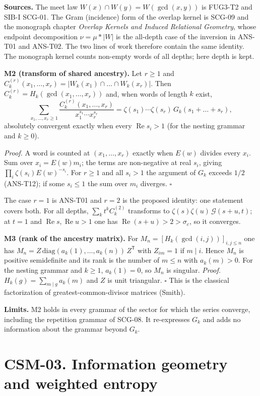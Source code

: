 \documentclass[
  11pt,
]{article}
\begin{document}
\textbf{Sources.} The meet law \(W(x)\cap W(y)=W(\gcd(x,y))\) is FUG3-T2
and SIB-I SCG-01. The Gram (incidence) form of the overlap kernel is
SCG-09 and the monograph chapter \emph{Overlap Kernels and Induced
Relational Geometry}, whose endpoint decomposition \(\nu=\mu*|W|\) is
the all-depth case of the inversion in ANS-T01 and ANS-T02. The two
lines of work therefore contain the same identity. The monograph kernel
counts non-empty words of all depths; here depth is kept.

\textbf{M2 (transform of shared ancestry).} Let \(r\ge1\) and
\(C_k^{(r)}(x_1,\dots,x_r)=|W_k(x_1)\cap\dots\cap W_k(x_r)|\). Then
\(C_k^{(r)}=H_k(\gcd(x_1,\dots,x_r))\) and, when words of length \(k\)
exist,
\[\sum_{x_1,\dots,x_r\ge1}\frac{C_k^{(r)}(x_1,\dots,x_r)}{x_1^{s_1}\cdots x_r^{s_r}}=\zeta(s_1)\cdots\zeta(s_r)\,G_k(s_1+\dots+s_r),\]
absolutely convergent exactly when every \(\operatorname{Re}s_i>1\) (for
the nesting grammar and \(k\ge0\)).

\emph{Proof.} A word is counted at \((x_1,\dots,x_r)\) exactly when
\(E(w)\) divides every \(x_i\). Sum over \(x_i=E(w)m_i\); the terms are
non-negative at real \(s_i\), giving \(\prod_i\zeta(s_i)E(w)^{-s_i}\).
For \(r\ge1\) and all \(s_i>1\) the argument of \(G_k\) exceeds \(1/2\)
(ANS-T12); if some \(s_i\le1\) the sum over \(m_i\) diverges.
\(\square\)

The case \(r=1\) is ANS-T01 and \(r=2\) is the proposed identity: one
statement covers both. For all depths, \(\sum_kt^kC_k^{(2)}\) transforms
to \(\zeta(s)\zeta(u)\,\mathcal G(s+u,t)\); at \(t=1\) and
\(\operatorname{Re}s,\operatorname{Re}u>1\) one has
\(\operatorname{Re}(s+u)>2>\sigma_c\), so it converges.

\textbf{M3 (rank of the ancestry matrix).} For
\(M_n=[H_k(\gcd(i,j))]_{i,j\le n}\) one has
\(M_n=Z\,\mathrm{diag}(a_k(1),\dots,a_k(n))\,Z^{\mathsf T}\) with
\(Z_{im}=1\) if \(m\mid i\). Hence \(M_n\) is positive semidefinite and
its rank is the number of \(m\le n\) with \(a_k(m)>0\). For the nesting
grammar and \(k\ge1\), \(a_k(1)=0\), so \(M_n\) is singular.
\emph{Proof.} \(H_k(g)=\sum_{m\mid g}a_k(m)\) and \(Z\) is unit
triangular. \(\square\) This is the classical factorization of
greatest-common-divisor matrices (Smith).

\textbf{Limits.} M2 holds in every grammar of the sector for which the
series converge, including the repetition grammar of SCG-08. It
re-expresses \(G_k\) and adds no information about the grammar beyond
\(G_k\).

\hypertarget{csm-03.-information-geometry-and-weighted-entropy}{%
\section{CSM-03. Information geometry and weighted
entropy}\label{csm-03.-information-geometry-and-weighted-entropy}}
\end{document}
